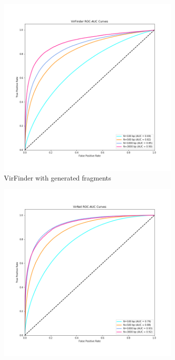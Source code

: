 \documentclass[10pt,journal,compsoc]{IEEEtran}
\begin{document}
\begin{figure}[!htbp]
	\centering
	\begin{subfigure}{0.3\textwidth}
		\includegraphics[width=\linewidth]{imgs/roc_auc.png}
		\caption{VirFinder with generated fragments} 
		\label{fig:roc_auc_virfindera}
	\end{subfigure}
	\begin{subfigure}{0.3\textwidth}
		\includegraphics[width=\linewidth]{imgs/virnet_roc_auc.png}

\end{subfigure}
\end{figure}
\end{document}
